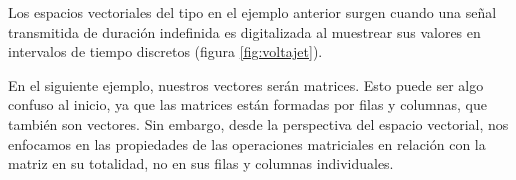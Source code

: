 Los espacios vectoriales del tipo en el ejemplo anterior surgen cuando una señal transmitida de duración indefinida es digitalizada al muestrear sus valores en intervalos de tiempo discretos (figura \ref{fig:voltajet}).

En el siguiente ejemplo, nuestros vectores serán matrices. Esto puede ser algo confuso al inicio, ya que las matrices están formadas por filas y columnas, que también son vectores. Sin embargo, desde la perspectiva del espacio vectorial, nos enfocamos en las propiedades de las operaciones matriciales en relación con la matriz en su totalidad, no en sus filas y columnas individuales.

